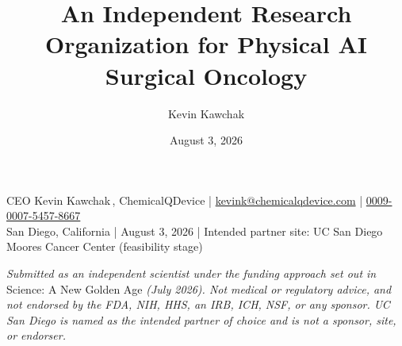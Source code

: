 \documentclass[11pt]{article}
\title{An Independent Research Organization for Physical AI Surgical Oncology}
\author{Kevin Kawchak}
\date{August 3, 2026}
\begin{document}
\thispagestyle{plain}


\vspace{0.35em}

\begin{center}
 \enspace
{} \enspace
{}
\end{center}

\vspace{-0.3em}
\apprule{0.8pt}
\vspace{0.05em}

\noindent\small CEO Kevin Kawchak\,,
ChemicalQDevice \;|\;
\href{mailto:kevink@chemicalqdevice.com}{kevink@chemicalqdevice.com} \;|\;
\href{https://orcid.org/0009-0007-5457-8667}{0009-0007-5457-8667}\\
San Diego, California \;|\; August 3, 2026 \;|\; Intended partner site: UC San
Diego Moores Cancer Center (feasibility stage)\normalsize\par

\vspace{0.05em}

\noindent\footnotesize\textit{Submitted as an independent scientist under the
funding approach set out in} Science: A New Golden Age \textit{(July 2026). Not
medical or regulatory advice, and not endorsed by the FDA, NIH, HHS, an IRB,
ICH, NSF, or any sponsor. UC San Diego is named as the intended partner of
choice and is not a sponsor, site, or endorser.}\normalsize\par

\vspace{-0.1em}
\apprule{0.4pt}







\end{document}
